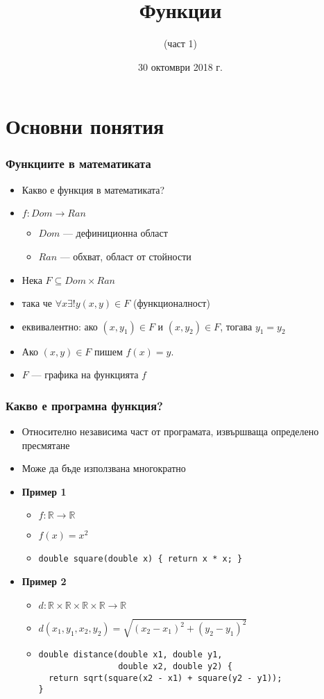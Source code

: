\documentclass{beamer}
\title{Функции}
\subtitle{(част 1)}
\date{30 октомври 2018 г.}
\newcommand{\RR}{\mathbb{R}}
\begin{document}
\begin{frame}
  \titlepage
\end{frame}

\section{Основни понятия}

\begin{frame}
  \frametitle{Функциите в математиката}

  \begin{itemize}[<+->]
  \item Какво е функция в математиката?
  \item $f : Dom \to Ran$
    \begin{itemize}
    \item $Dom$ --- дефиниционна област
    \item $Ran$ --- обхват, област от стойности
    \end{itemize}
  \item Нека $F \subseteq Dom \times Ran$
  \item така че $\forall x \exists ! y (x,y) \in F$ (функционалност)
  \item еквивалентно: ако $(x,y_1) \in F$ и $(x,y_2) \in F$, тогава $y_1 = y_2$
  \item Ако $(x,y)\in F$ пишем $f(x) = y$.
  \item $F$ --- графика на функцията $f$
  \end{itemize}
\end{frame}

\begin{frame}[fragile]
  \frametitle{Какво е програмна функция?}

  \begin{itemize}[<+->]
  \item Относително независима част от програмата, извършваща определено пресмятане
  \item Може да бъде използвана многократно
    \pause
  \item \textbf{Пример 1}
    \begin{itemize}
    \item $f:\RR \to \RR$
    \item $f(x) = x^2$
    \item \lstinline!double square(double x) { return x * x; }!
    \end{itemize}
  \item \textbf{Пример 2}
    \begin{itemize}
    \item $d:\RR\times\RR\times\RR\times\RR \to \RR$
    \item $d(x_1,y_1,x_2,y_2) = \sqrt{(x_2-x_1)^2 + (y_2-y_1)^2}$
    \item
\begin{lstlisting}
double distance(double x1, double y1,
                double x2, double y2) {
  return sqrt(square(x2 - x1) + square(y2 - y1));
}
\end{lstlisting}
    \end{itemize}
  \end{itemize}
\end{frame}
\end{document}
